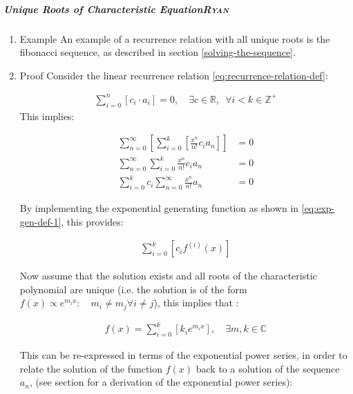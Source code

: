 \documentclass[11pt]{article}
\begin{document}
\subparagraph{Unique Roots of Characteristic Equation\hfill{}\textsc{Ryan}}
\label{uniq-roots-recurrence}
\begin{enumerate}
\item Example
\label{sec:orgbc8bd8e}
An example of a recurrence relation with all unique roots is the fibonacci sequence, as described in section \ref{solving-the-sequence}.
\item Proof
\label{sec:org15e68ac}
Consider the linear recurrence relation \eqref{eq:recurrence-relation-def}:

\begin{align}
\sum^{n}_{i= 0}   \left[ c_i \cdot  a_i \right] = 0, \quad \exists c \in
\mathbb{R}, \enspace \forall i<k\in\mathbb{Z}^+ \nonumber \label{eq:recurrence-relation-def}
\end{align}
This implies:


\begin{align}
    \sum^{\infty}_{n= 0}   \left[ \sum^{k}_{i= 0}   \left[ \frac{x^n}{n!} c_i a_n \right]  \right]  &= 0 \\
    \sum^{\infty}_{n= 0}    \sum^{k}_{i= 0}    \frac{x^n}{n!} c_i a_n    &= 0 \\
        \sum^{k}_{i= 0} c_i \sum^{\infty}_{n= 0}    \frac{x^n}{n!}  a_n    &= 0
\end{align}

By implementing the exponential generating function as shown in
\eqref{eq:exp-gen-def-1}, this provides:

\begin{align}
   \sum^{k}_{i= 0}   \left[ c_i f^{\left( i \right)}\left( x \right) \right]
\end{align}


Now assume that the solution exists and all roots of the characteristic polynomial are unique (i.e. the solution is of the form \(f{\left({ x }\right)} \propto e^{m_i x}: \quad m_i \neq m_j \forall i\neq j\)), this implies that  \cite[Ch. 4]{zillDifferentialEquations2009a} :

\begin{align}
    f{\left({ x }\right)} = \sum^{k}_{i= 0}   {\left[{ k_i e^{m_i x} }\right]}, \quad \exists m,k \in \mathbb{C} \nonumber
\end{align}

This can be re-expressed in terms of the exponential power series, in order to relate the solution of the function \(f{\left({ x }\right)}\) back to a solution of the sequence \(a_n\), (see section for a derivation of the exponential power series):


\end{enumerate}
\end{document}
